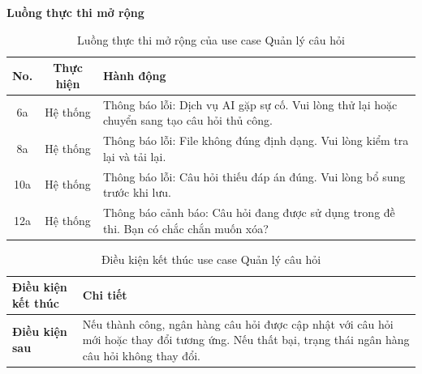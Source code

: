 ﻿\documentclass[../DoAn.tex]{subfiles}
\begin{document}
\noindent\textbf{Luồng thực thi mở rộng}
\begin{table}[H]
\centering
\begin{tabular}{|c|c|p{9cm}|}
\hline
\textbf{No.} & \textbf{Thực hiện} & \textbf{Hành động} \\ \hline
6a & Hệ thống & Thông báo lỗi: Dịch vụ AI gặp sự cố. Vui lòng thử lại hoặc chuyển sang tạo câu hỏi thủ công. \\ \hline
8a & Hệ thống & Thông báo lỗi: File không đúng định dạng. Vui lòng kiểm tra lại và tải lại. \\ \hline
10a & Hệ thống & Thông báo lỗi: Câu hỏi thiếu đáp án đúng. Vui lòng bổ sung trước khi lưu. \\ \hline
12a & Hệ thống & Thông báo cảnh báo: Câu hỏi đang được sử dụng trong đề thi. Bạn có chắc chắn muốn xóa? \\ \hline
\end{tabular}
\caption{Luồng thực thi mở rộng của use case Quản lý câu hỏi}
\label{table:2.3.2_ext}
\end{table}
\begin{table}[H]
\centering
\begin{tabular}{|p{4cm}|p{10cm}|}
\hline
\textbf{Điều kiện kết thúc} & \textbf{Chi tiết} \\ \hline
\textbf{Điều kiện sau} & Nếu thành công, ngân hàng câu hỏi được cập nhật với câu hỏi mới hoặc thay đổi tương ứng. Nếu thất bại, trạng thái ngân hàng câu hỏi không thay đổi. \\ \hline
\end{tabular}
\caption{Điều kiện kết thúc use case Quản lý câu hỏi}
\label{table:2.3.2_post}
\end{table}
\end{document}
